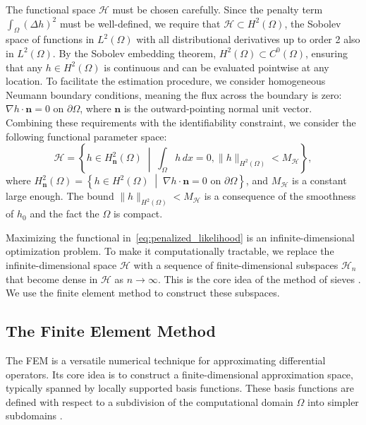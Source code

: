 \documentclass[11pt]{article}
\begin{document}
The functional space $\mathcal{H}$ must be chosen carefully. Since the penalty term $\int_{\Omega} (\Delta h)^2$ must be well-defined, we require that $\mathcal{H} \subset H^2(\Omega)$, the Sobolev space of functions in $L^2(\Omega)$ with all distributional derivatives up to order 2 also in $L^2(\Omega)$. By the Sobolev embedding theorem, $H^2(\Omega) \subset C^0(\Omega)$, ensuring that any $h \in H^2(\Omega)$ is continuous and can be evaluated pointwise at any location. To facilitate the estimation procedure, we consider homogeneous Neumann boundary conditions, meaning the flux across the boundary is zero: $\nabla h \cdot \mathbf{n} = 0 \text{ on } \partial \Omega$, where $\mathbf{n}$ is the outward-pointing normal unit vector. Combining these requirements with the identifiability constraint, we consider the following functional parameter space:
	$$
	\mathcal{H} = \left\{ h \in H^2_{\mathbf{n}}(\Omega) \;\middle|\; \int_{\Omega} h \, dx = 0, \|h\|_{H^2(\Omega)} < M_{\mathcal{H}} \right\},
	$$
	where $H^2_{\mathbf{n}}(\Omega) = \left\{ h \in H^2(\Omega) \;\middle|\; \nabla h \cdot \mathbf{n} = 0 \text{ on } \partial \Omega \right\}$, and $M_{\mathcal{H}}$ is a constant large enough. The bound $\|h\|_{H^2(\Omega)}<M_{\mathcal{H}}$ is a consequence of the smoothness of $h_0$ and the fact the $\Omega$ is compact. %
	
Maximizing the functional in~\eqref{eq:penalized_likelihood} is an infinite-dimensional optimization problem. To make it computationally tractable, we replace the infinite-dimensional space $\mathcal{H}$ with a sequence of finite-dimensional subspaces $\mathcal{H}_n$ that become dense in $\mathcal{H}$ as $n \to \infty$. This is the core idea of the method of sieves \citep{chen2007large}. We use the finite element method to construct these subspaces.
	


\subsection{The Finite Element Method}
The FEM is a versatile numerical technique for approximating differential operators. Its core idea is to construct a finite-dimensional approximation space, typically spanned by locally supported basis functions. These basis functions are defined with respect to a subdivision of the computational domain $\Omega$ into simpler subdomains \citep{quarteroni2009numerical}.
\end{document}
